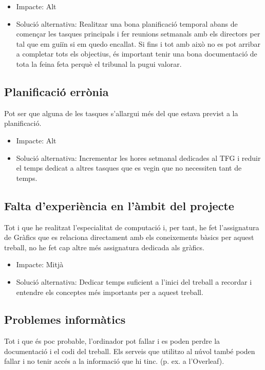 \documentclass{article}
\begin{document}
\begin{itemize}
    \item Impacte: Alt
    \item Solució alternativa: Realitzar una bona planificació temporal abans de començar les tasques principals i fer reunions setmanals amb els directors per tal que em guiïn si em quedo encallat. Si fins i tot amb això no es pot arribar a completar tots els objectius, és important tenir una bona documentació de tota la feina feta perquè el tribunal la pugui valorar.
\end{itemize}

\subsection{Planificació errònia}

Pot ser que alguna de les tasques s'allargui més del que estava previst a la planificació.

\begin{itemize}
    \item Impacte: Alt
    \item Solució alternativa: Incrementar les hores setmanal dedicades al TFG i reduir el temps dedicat a altres tasques que es vegin que no necessiten tant de temps.
\end{itemize}

\subsection{Falta d'experiència en l'àmbit del projecte}

Tot i que he realitzat l'especialitat de computació i, per tant, he fet l'assignatura de Gràfics que es relaciona directament amb els coneixements bàsics per aquest treball, no he fet cap altre més assignatura dedicada als gràfics.

\begin{itemize}
    \item Impacte: Mitjà
    \item Solució alternativa: Dedicar temps suficient a l'inici del treball a recordar i entendre els conceptes més importants per a aquest treball.
\end{itemize}

\subsection{Problemes informàtics}

Tot i que és poc probable, l'ordinador pot fallar i es poden perdre la documentació i el codi del treball. Els serveis que utilitzo al núvol també poden fallar i no tenir accés a la informació que hi tinc. (p. ex. a l'Overleaf).
\end{document}
